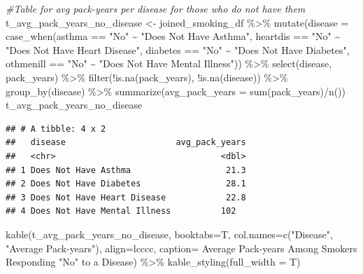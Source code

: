 \documentclass[
]{article}
\newenvironment{Shaded}{\begin{snugshade}}{\end{snugshade}}
\newcommand{\AttributeTok}[1]{\textcolor[rgb]{0.77,0.63,0.00}{#1}}
\newcommand{\CommentTok}[1]{\textcolor[rgb]{0.56,0.35,0.01}{\textit{#1}}}
\newcommand{\FunctionTok}[1]{\textcolor[rgb]{0.00,0.00,0.00}{#1}}
\newcommand{\NormalTok}[1]{#1}
\newcommand{\OtherTok}[1]{\textcolor[rgb]{0.56,0.35,0.01}{#1}}
\newcommand{\SpecialCharTok}[1]{\textcolor[rgb]{0.00,0.00,0.00}{#1}}
\newcommand{\StringTok}[1]{\textcolor[rgb]{0.31,0.60,0.02}{#1}}
\begin{document}
\begin{Shaded}
\begin{Highlighting}[]
\CommentTok{\#Table for avg pack{-}years per disease for those who do not have them}
\NormalTok{t\_avg\_pack\_years\_no\_disease }\OtherTok{\textless{}{-}}\NormalTok{ joined\_smoking\_df }\SpecialCharTok{\%\textgreater{}\%}
  \FunctionTok{mutate}\NormalTok{(}\AttributeTok{disease =} \FunctionTok{case\_when}\NormalTok{(asthma }\SpecialCharTok{==} \StringTok{"No"} \SpecialCharTok{\textasciitilde{}} \StringTok{"Does Not Have Asthma"}\NormalTok{,}
\NormalTok{                            heartdis }\SpecialCharTok{==} \StringTok{"No"} \SpecialCharTok{\textasciitilde{}} \StringTok{"Does Not Have Heart Disease"}\NormalTok{,}
\NormalTok{                            diabetes }\SpecialCharTok{==} \StringTok{"No"} \SpecialCharTok{\textasciitilde{}} \StringTok{"Does Not Have Diabetes"}\NormalTok{,}
\NormalTok{                            othmenill }\SpecialCharTok{==} \StringTok{"No"} \SpecialCharTok{\textasciitilde{}} \StringTok{"Does Not Have Mental Illness"}\NormalTok{)) }\SpecialCharTok{\%\textgreater{}\%}
  \FunctionTok{select}\NormalTok{(disease, pack\_years) }\SpecialCharTok{\%\textgreater{}\%}
  \FunctionTok{filter}\NormalTok{(}\SpecialCharTok{!}\FunctionTok{is.na}\NormalTok{(pack\_years), }\SpecialCharTok{!}\FunctionTok{is.na}\NormalTok{(disease)) }\SpecialCharTok{\%\textgreater{}\%}
  \FunctionTok{group\_by}\NormalTok{(disease) }\SpecialCharTok{\%\textgreater{}\%}
  \FunctionTok{summarize}\NormalTok{(}\AttributeTok{avg\_pack\_years =} \FunctionTok{sum}\NormalTok{(pack\_years)}\SpecialCharTok{/}\FunctionTok{n}\NormalTok{())}
\NormalTok{t\_avg\_pack\_years\_no\_disease}
\end{Highlighting}
\end{Shaded}

\begin{verbatim}
## # A tibble: 4 x 2
##   disease                      avg_pack_years
##   <chr>                                 <dbl>
## 1 Does Not Have Asthma                   21.3
## 2 Does Not Have Diabetes                 28.1
## 3 Does Not Have Heart Disease            22.8
## 4 Does Not Have Mental Illness          102
\end{verbatim}

\begin{Shaded}
\begin{Highlighting}[]
\FunctionTok{kable}\NormalTok{(t\_avg\_pack\_years\_no\_disease, }
      \AttributeTok{booktabs=}\NormalTok{T, }
      \AttributeTok{col.names=}\FunctionTok{c}\NormalTok{(}\StringTok{"Disease"}\NormalTok{, }\StringTok{"Average Pack{-}years"}\NormalTok{),  }
      \AttributeTok{align=}\StringTok{\textquotesingle{}lcccc\textquotesingle{}}\NormalTok{, }
      \AttributeTok{caption=} \StringTok{\textquotesingle{}Average Pack{-}years Among Smokers Responding "No" to a Disease\textquotesingle{}}\NormalTok{) }\SpecialCharTok{\%\textgreater{}\%}
      \FunctionTok{kable\_styling}\NormalTok{(}\AttributeTok{full\_width =}\NormalTok{ T)}
\end{Highlighting}
\end{Shaded}
\end{document}
